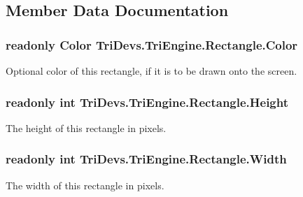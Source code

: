 \subsection{Member Data Documentation}
\hypertarget{struct_tri_devs_1_1_tri_engine_1_1_rectangle_a7d89328df1188361322d0266c3e9c472}{
\subsubsection[{Color}]{\setlength{\rightskip}{0pt plus 5cm}readonly {\bf Color} Tri\-Devs.\-Tri\-Engine.\-Rectangle.\-Color}}\label{struct_tri_devs_1_1_tri_engine_1_1_rectangle_a7d89328df1188361322d0266c3e9c472}


Optional color of this rectangle, if it is to be drawn onto the screen. 

\hypertarget{struct_tri_devs_1_1_tri_engine_1_1_rectangle_ab658107474a933269cab1d3dcbb46cf0}{
\subsubsection[{Height}]{\setlength{\rightskip}{0pt plus 5cm}readonly int Tri\-Devs.\-Tri\-Engine.\-Rectangle.\-Height}}\label{struct_tri_devs_1_1_tri_engine_1_1_rectangle_ab658107474a933269cab1d3dcbb46cf0}


The height of this rectangle in pixels. 

\hypertarget{struct_tri_devs_1_1_tri_engine_1_1_rectangle_a290425f699b44898216275f26b585bf0}{
\subsubsection[{Width}]{\setlength{\rightskip}{0pt plus 5cm}readonly int Tri\-Devs.\-Tri\-Engine.\-Rectangle.\-Width}}\label{struct_tri_devs_1_1_tri_engine_1_1_rectangle_a290425f699b44898216275f26b585bf0}


The width of this rectangle in pixels. 

